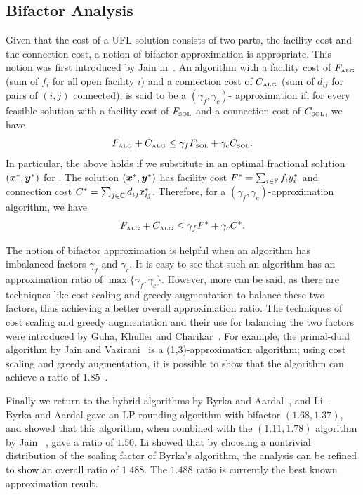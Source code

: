 \documentclass[oneside,final]{ucr}
\begin{document}
\subsection{Bifactor Analysis} \label{subsec: bifactor}
Given that the cost of a UFL solution consists of two parts,
the facility cost and the connection cost, a notion of
bifactor approximation is appropriate. This notion was first
introduced by Jain {\etal} in~\cite{JainMMSV03}. An
algorithm with a facility cost of $F_{\mbox{\tiny\rm ALG}}$ (sum of
$f_i$ for all open facility $i$) and a connection cost of
$C_{\mbox{\tiny\rm ALG}}$ (sum of $d_{ij}$ for pairs of $(i,j)$
connected), is said to be a $(\gamma_f,\gamma_c)$-
approximation if, for every feasible solution {\SOL} with a
facility cost of $F_{{{\mbox{\tiny\rm SOL}}}}$ and a connection cost of
$C_{{{\mbox{\tiny\rm SOL}}}}$, we have
\begin{equation*}
  F_{\mbox{\tiny\rm ALG}} + C_{\mbox{\tiny\rm ALG}} \leq \gamma_f F_{{{\mbox{\tiny\rm SOL}}}} +
  \gamma_c C_{{{\mbox{\tiny\rm SOL}}}}.
\end{equation*}
In particular, the above holds if we substitute in an
optimal fractional solution $(\boldsymbol{x}^\ast,\boldsymbol{y}^\ast)$ for
{\SOL}. The solution $(\boldsymbol{x}^\ast,\boldsymbol{y}^\ast)$ has facility
cost $F^\ast = \sum_{i\in\mathbb{F}} f_i y_i^\ast$ and
connection cost $C^\ast = \sum_{j\in\mathbb{C}} d_{ij}
x_{ij}^\ast$. Therefore, for a
$(\gamma_f,\gamma_c)$-approximation algorithm, we have
\begin{equation*}
  F_{\mbox{\tiny\rm ALG}} + C_{\mbox{\tiny\rm ALG}} \leq \gamma_f F^\ast +
  \gamma_c C^\ast.
\end{equation*}

The notion of bifactor approximation is helpful when an
algorithm has imbalanced factors $\gamma_f$ and
$\gamma_c$. It is easy to see that such an algorithm has an
approximation ratio of $\max\{\gamma_f,
\gamma_c\}$. However, more can be said, as there are
techniques like cost scaling and greedy augmentation to
balance these two factors, thus achieving a better overall
approximation ratio. The techniques of cost scaling and
greedy augmentation and their use for balancing the two
factors were introduced by Guha, Khuller and
Charikar~\cite{GuhaK98, CharikarG05}. For example, the
primal-dual algorithm by Jain and Vazirani~\cite{JainV03} is
a (1,3)-approximation algorithm; using cost scaling and
greedy augmentation, it is possible to show that the
algorithm can achieve a ratio of $1.85$~\cite{CharikarG05}.

Finally we return to the hybrid algorithms by Byrka and
Aardal~\cite{ByrkaA10}, and Li~\cite{Li11}. Byrka and Aardal
gave an LP-rounding algorithm with bifactor $(1.68,1.37)$,
and showed that this algorithm, when combined with the
$(1.11,1.78)$ algorithm by Jain {\etal}~\cite{JainMMSV03},
gave a ratio of $1.50$. Li showed that by choosing a
nontrivial distribution of the scaling factor of Byrka's
algorithm, the analysis can be refined to show an overall
ratio of $1.488$. The $1.488$ ratio is currently the best
known approximation result.
\end{document}
